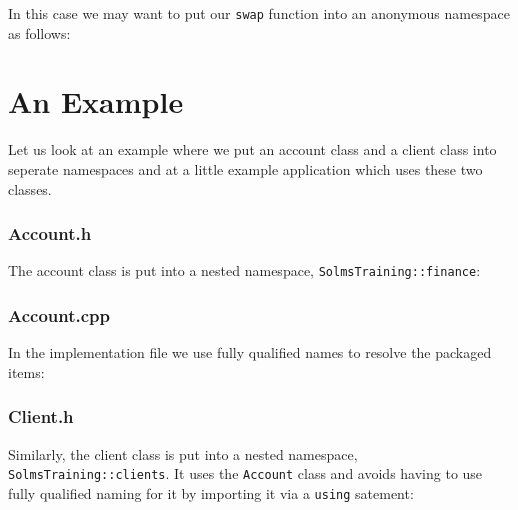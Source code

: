 In this case we may want to put our \verb+swap+ function into an 
anonymous namespace as follows:



\section{An Example}

Let us look at an example where we put an account class and a client 
class into seperate namespaces and at a little example application 
which uses these two classes.


\subsubsection{Account.h}

The account class is put into a nested namespace, 
\verb+SolmsTraining::finance+:

\noindent{\small }


\subsubsection{Account.cpp}

In the implementation file we use fully qualified names to resolve
the packaged items:

\noindent{\small }


\subsubsection{Client.h}

Similarly, the client class is put into a nested namespace, 
\verb+SolmsTraining::clients+. It uses the \verb+Account+ class
and avoids having to use fully qualified naming for it by importing
it via a \verb+using+ satement:

